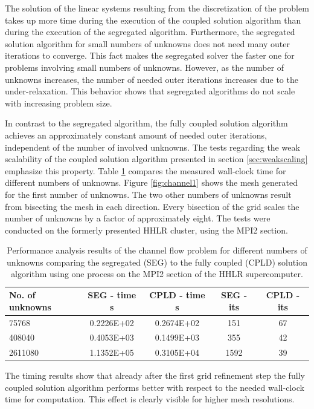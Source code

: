 The solution of the linear systems resulting from the discretization of the problem takes up more time during the execution of the coupled solution algorithm than during the execution of the segregated algorithm. Furthermore, the segregated solution algorithm for small numbers of unknowns does not need many outer iterations to converge. This fact makes the segregated solver the faster one for problems involving small numbers of unknowns. However, as the number of unknowns increases, the number of needed outer iterations increases due to the under-relaxation. This behavior shows that segregated algorithms do not scale with increasing problem size.

In contrast to the segregated algorithm, the fully coupled solution algorithm achieves an approximately constant amount of needed outer iterations, independent of the number of involved unknowns. The tests regarding the weak scalability of the coupled solution algorithm presented in section \ref{sec:weakscaling} emphasize this property. Table \ref{tab:channelcompare} compares the measured wall-clock time for different numbers of unknowns. Figure \ref{fig:channel1} shows the mesh generated for the first number of unknowns. The two other numbers of unknowns result from bisecting the mesh in each direction. Every bisection of the grid scales the number of unknowns by a factor of approximately eight. The tests were conducted on the formerly presented HHLR cluster, using the MPI2 section. 

\begin{table}[h!]\centering
  \caption{Performance analysis results of the channel flow problem for different numbers of unknowns comparing the segregated (SEG) to the fully coupled (CPLD) solution algorithm using one process on the MPI2 section of the HHLR supercomputer. }
  \begin{tabular}{lcccc}\toprule
    No. of unknowns & SEG - time s & CPLD - time s & SEG - its & CPLD - its \\
    \midrule
    \rowcolor{tud0a} 75768    & 0.2226E+02 & 0.2674E+02 & 151  & 67 \\
    \rowcolor{black!00} 408040   & 0.4053E+03 & 0.1499E+03 & 355  & 42 \\
    \rowcolor{tud0a} 2611080  & 1.1352E+05 & 0.3105E+04 & 1592 & 39 \\
  \end{tabular}
  \label{tab:channelcompare}
\end{table}

The timing results show that already after the first grid refinement step the fully coupled solution algorithm performs better with respect to the needed wall-clock time for computation. This effect is clearly visible for higher mesh resolutions.

